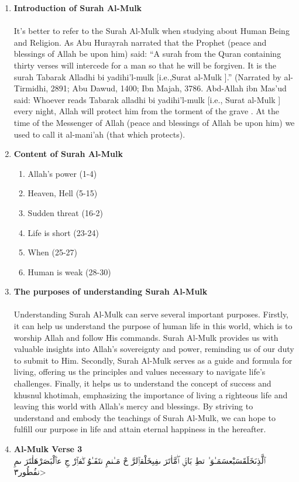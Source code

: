 \documentclass[12pt,titlepage]{article}
\begin{document}
\begin{enumerate}[label=\textbf{\Alph*.}]
    \item \textbf{Introduction of Surah Al-Mulk}
    \paragraph{}
     It's better to refer to the Surah Al-Mulk when studying about Human Being and Religion. As Abu Hurayrah narrated that the Prophet (peace and blessings of Allah be upon him) said: “A surah from the Quran containing thirty verses will intercede for a man so that he will be forgiven. It is the surah Tabarak Alladhi bi yadihi’l-mulk [i.e.,Surat al-Mulk ].” (Narrated by al-Tirmidhi, 2891; Abu Dawud, 1400; Ibn Majah, 3786. Abd-Allah ibn Mas'ud said: Whoever reads Tabarak alladhi bi yadihi'l-mulk [i.e., Surat al-Mulk ] every night, Allah will protect him from the torment of the grave . At the time of the Messenger of Allah (peace and blessings of Allah be upon him) we used to call it al-mani'ah (that which protects).
    \item \textbf{Content of Surah Al-Mulk}
    \begin{enumerate}[label=\alph*.]
        \item Allah’s power (1-4)
        \item Heaven, Hell (5-15)
        \item Sudden threat (16-2)
        \item Life is short (23-24)
        \item When (25-27)
        \item Human is weak (28-30)
    \end{enumerate}
    \item \textbf{The purposes of understanding Surah Al-Mulk}
    \paragraph{}
    Understanding Surah Al-Mulk can serve several important purposes. Firstly, it can help us understand the purpose of human life in this world, which is to worship Allah and follow His commands. Surah Al-Mulk provides us with valuable insights into Allah's sovereignty and power, reminding us of our duty to submit to Him. Secondly, Surah Al-Mulk serves as a guide and formula for living, offering us the principles and values necessary to navigate life's challenges. Finally, it helps us to understand the concept of success and khusnul khotimah, emphasizing the importance of living a righteous life and leaving this world with Allah's mercy and blessings. By striving to understand and embody the teachings of Surah Al-Mulk, we can hope to fulfill our purpose in life and attain eternal happiness in the hereafter.
    \item \textbf{Al-Mulk Verse 3}
    \mbox{}\\ 
    \<ٱلَّذِىَخَلَقَسَبْعسَمَـٰوَ ٰ تطِ بَاقًۭ اۖمَّاٰتَرَ ىفِىِخَلْقٱِلرَّ حْ مَـٰنمِ نتَفَـٰوُ تَۖفٱِرْ جِ عٱَلْبَصَرْهَلٰتَرَ ىمِ نفُطُور٣>

\end{enumerate}
\end{document}
